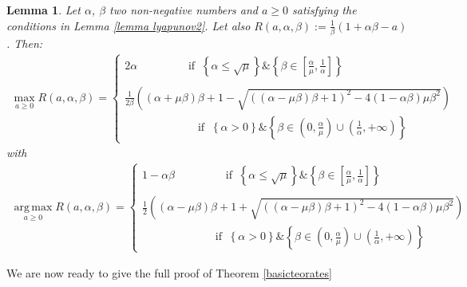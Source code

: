 \documentclass[reqno]{amsart}
\theoremstyle{plain}
\newtheorem{lemma}{Lemma}	%
\theoremstyle{definition}
\theoremstyle{remark}
\DeclareMathOperator*{\argmax}{arg\,max}	%
\begin{document}
\begin{lemma}\label{lemma lyapunov3}
	Let $\alpha$, $\beta$ two non-negative numbers and $a\geq 0$ satisfying the conditions in Lemma \ref{lemma lyapunov2}. Let also $R(a,\alpha,\beta) := \frac{1}{\beta}\left(1+\alpha\beta-a\right)$. Then:
	\begin{equation}
		\begin{aligned}
		\underset{a\geq 0}{\max} R(a,\alpha,\beta)= \begin{cases}
				2\alpha  \qquad \qquad  ~ \text{ if } ~   \left\{\alpha\leq \sqrt{\mu}\right\}\&  \left\{\beta\in[\frac{\alpha}{\mu},\frac{1}{\alpha}]\right\} &  \\
				\\
				\frac{1}{2\beta}\left((\alpha+\mu\beta)\beta+1 - \sqrt{\left((\alpha-\mu\beta)\beta+1\right)^{2}-4(1-\alpha\beta)\mu\beta^{2}}\right)   & \\ 
				\qquad \qquad \qquad  ~ \text{ if } ~   \left\{  \alpha > 0\right\} \& \left\{\beta\in \left(0, \frac{\alpha}{\mu}\right)\cup \left(\frac{1}{\alpha},+\infty\right) \right\} &
			\end{cases}
		\end{aligned}
	\end{equation}
with 		\begin{equation}
	\begin{aligned}
		\underset{a\geq 0}{\argmax} R(a,\alpha,\beta)= \begin{cases}
			1-\alpha\beta \qquad \qquad  ~ \text{ if } ~   \left\{\alpha\leq \sqrt{\mu}\right\}\&  \left\{\beta\in[\frac{\alpha}{\mu},\frac{1}{\alpha}]\right\} &  \\
			\\
\frac{1}{2}\left((\alpha-\mu\beta)\beta+1 + \sqrt{\left((\alpha-\mu\beta)\beta+1\right)^{2}-4(1-\alpha\beta)\mu\beta^{2}}\right)  & \\ 
			\qquad \qquad \qquad  ~ \text{ if } ~   \left\{  \alpha > 0\right\} \& \left\{\beta\in \left(0, \frac{\alpha}{\mu}\right)\cup \left(\frac{1}{\alpha},+\infty\right) \right\} &
		\end{cases}
	\end{aligned}
\end{equation}
\end{lemma}

We are now ready to give the full proof of Theorem \ref{basicteorates}
\end{document}
